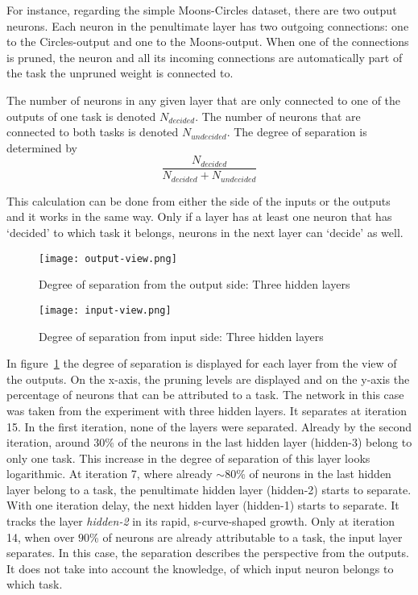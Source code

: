 For instance, regarding the simple Moons-Circles dataset, there are two output neurons.
Each neuron in the penultimate layer has two outgoing connections: one to the Circles-output and one to the Moons-output.
When one of the connections is pruned, the neuron and all its incoming connections are automatically part of the task the unpruned weight is connected to.

The number of neurons in any given layer that are only connected to one of the outputs of one task is denoted $N_{decided}$.
The number of neurons that are connected to both tasks is denoted $N_{undecided}$.
The degree of separation is determined by 
\[
\frac{N_{decided}}{N_{decided}+N_{undecided}}
\]

This calculation can be done from either the side of the inputs or the outputs and it works in the same way.
Only if a layer has at least one neuron that has `decided' to which task it belongs, neurons in the next layer can `decide' as well.

\begin{figure}[ht]
    \centering
    \texttt{[image: output-view.png]}
    \caption{
    Degree of separation from the output side: Three hidden layers
    }\label{fig:outview}
\end{figure}

\begin{figure}[ht]
    \centering
    \texttt{[image: input-view.png]}
    \caption{    
        Degree of separation from input side: Three hidden layers
    }\label{fig:inview}
\end{figure}

In figure~\ref{fig:outview} the degree of separation is displayed for each layer from the view of the outputs.
On the x-axis, the pruning levels are displayed and on the y-axis the percentage of neurons that can be attributed to a task.
The network in this case was taken from the experiment with three hidden layers.
It separates at iteration 15.
In the first iteration, none of the layers were separated.
Already by the second iteration, around $30$\% of the neurons in the last hidden layer (hidden-3) belong to only one task.
This increase in the degree of separation of this layer looks logarithmic.
At iteration 7, where already $\sim80$\% of neurons in the last hidden layer belong to a task, the penultimate hidden layer (hidden-2) starts to separate.
With one iteration delay, the next hidden layer (hidden-1) starts to separate.
It tracks the layer \textit{hidden-2} in its rapid, s-curve-shaped growth.
Only at iteration 14, when over $90$\% of neurons are already attributable to a task, the input layer separates.
In this case, the separation describes the perspective from the outputs.
It does not take into account the knowledge, of which input neuron belongs to which task.

